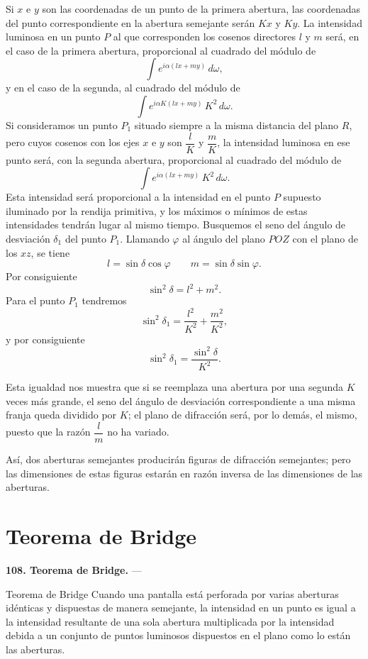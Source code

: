 Si $x$ e $y$ son las coordenadas de un punto de la primera abertura, las
coordenadas del punto correspondiente en la abertura semejante serán
$Kx$ y $Ky$. La intensidad luminosa en un punto $P$ al que corresponden
los cosenos directores $l$ y $m$ será, en el caso de la primera abertura,
proporcional al cuadrado del módulo de
\[
\int e^{i\alpha(lx+my)}\,d\omega,
\]
y en el caso de la segunda, al cuadrado del módulo de
\[
\int e^{i\alpha K(lx+my)}\,K^2\,d\omega.
\]
Si consideramos un punto $P_1$ situado siempre a la misma distancia del
plano $R$, pero cuyos cosenos con los ejes $x$ e $y$ son $\dfrac{l}{K}$ y
$\dfrac{m}{K}$, la intensidad luminosa en ese punto será, con la segunda
abertura, proporcional al cuadrado del módulo de
\[
\int e^{i\alpha(lx+my)}\,K^2\,d\omega.
\]
Esta intensidad será proporcional a la intensidad en el punto $P$
supuesto iluminado por la rendija primitiva, y los máximos o mínimos de
estas intensidades tendrán lugar al mismo tiempo. Busquemos el seno del
ángulo de desviación $\delta_1$ del punto $P_1$. Llamando $\varphi$ al
ángulo del plano $POZ$ con el plano de los $xz$, se tiene
\[
l=\sin\delta\cos\varphi\qquad m=\sin\delta\sin\varphi.
\]
Por consiguiente
\[
\sin^2\delta = l^2+m^2.
\]
Para el punto $P_1$ tendremos
\[
\sin^2\delta_1 = \frac{l^2}{K^2}+\frac{m^2}{K^2},
\]
y por consiguiente
\[
\sin^2\delta_1 = \frac{\sin^2\delta}{K^2}.
\]

Esta igualdad nos muestra que si se reemplaza una abertura por una
segunda $K$ veces más grande, el seno del ángulo de desviación
correspondiente a una misma franja queda dividido por $K$; el plano de
difracción será, por lo demás, el mismo, puesto que la razón $\dfrac{l}{m}$
no ha variado.

Así, dos aberturas semejantes producirán figuras de difracción
semejantes; pero las dimensiones de estas figuras estarán en razón
inversa de las dimensiones de las aberturas.

\section{Teorema de Bridge}

\noindent\textbf{108. Teorema de Bridge.} —

\begin{enunciado}{Teorema de Bridge}
Cuando una pantalla está perforada por varias aberturas idénticas y
dispuestas de manera semejante, la intensidad en un punto es igual a la
intensidad resultante de una sola abertura multiplicada por la intensidad
debida a un conjunto de puntos luminosos dispuestos en el plano como lo
están las aberturas.
\end{enunciado}

